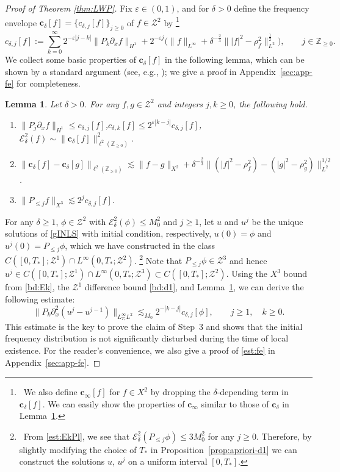 \documentclass{amsart}
\newtheorem{lemma}[proposition]{Lemma}
\numberwithin{equation}{section}
\newcommand{\Z}{\mathbb{Z}}
\newcommand{\eps}{\varepsilon}
\begin{document}
\begin{proof}[Proof of Theorem \ref{thm:LWP}]
Fix $\eps \in (0,1)$, and for $\delta>0$ define the frequency envelope $\mathbf{c}_\delta [f]=\{ c_{\delta,j}[f]\}_{j\geq 0}$ of $f\in \mathcal{Z}^2$ by%
\footnote{~We also define $\mathbf{c}_\infty [f]$ for $f\in X^2$ by dropping the $\delta$-depending term in $\mathbf{c}_\delta [f]$.
We can easily show the properties of $\mathbf{c}_\infty$ similar to those of $\mathbf{c}_\delta$ in Lemma~\ref{lem:fe}.}
\[ c_{\delta,j}[f]:=\sum _{k=0}^{\infty}2^{-\eps |j-k|}\| P_k\partial_xf\|_{H^1}+2^{-\eps j}\big( \| f\|_{L^\infty}+\delta^{-\frac23}\big\| |f|^2-\rho_f^2\big\|_{L^2}^{\frac12}\big) ,\qquad j\in\Z_{\geq 0}.\]
We collect some basic properties of $\mathbf{c}_\delta [f]$ in the following lemma, which can be shown by a standard argument (see, e.g., \cite{Ifrim-Tataru}); we give a proof in Appendix~\ref{sec:app-fe} for completeness.
\begin{lemma}\label{lem:fe}
Let $\delta>0$.
For any $f,g\in \mathcal{Z}^2$ and integers $j,k\geq 0$, the following hold.
\begin{enumerate}
\item[$\mathrm{(i)}$] $\| P_j\partial_xf\|_{H^1}\leq c_{\delta,j}[f]$,\quad $c_{\delta,k}[f]\leq 2^{\eps |k-j|}c_{\delta,j}[f]$,\quad $\mathcal{E}^2_\delta(f)\sim \| \mathbf{c}_\delta[f]\|_{\ell^2(\Z_{\geq 0})}^2$.
\item[$\mathrm{(ii)}$] $\big\| \mathbf{c}_\delta[f]-\mathbf{c}_\delta[g]\big\| _{\ell^2(\Z_{\geq 0})}\lesssim \| f-g\|_{X^2}+\delta^{-\frac23}\big\| (|f|^2-\rho_f^2)-(|g|^2-\rho_g^2)\big\|_{L^2}^{1/2}$.
\item[$\mathrm{(iii)}$] $\| P_{\leq j}f\|_{X^3}\lesssim 2^jc_{\delta,j}[f]$.
\end{enumerate}
\end{lemma}

For any $\delta\geq 1$, $\phi\in \mathcal{Z}^2$ with $\mathcal{E}^2_\delta(\phi)\leq M_0^2$ and $j\geq 1$, let $u$ and $u^j$ be the unique solutions of \eqref{gINLS} with initial condition, respectively, $u(0)=\phi$ and $u^j(0)=P_{\leq j}\phi$, which we have constructed in the class $C([0,T_*];\mathcal{Z}^1)\cap L^\infty(0,T_*;\mathcal{Z}^2)$.%
\footnote{~From \eqref{est:EkPl}, we see that $\mathcal{E}^2_\delta(P_{\leq j}\phi)\leq 3M_0^2$ for any $j\geq 0$.
Therefore, by slightly modifying the choice of $T_*$ in Proposition~\ref{prop:apriori-d1} we can construct the solutions $u$, $u^j$ on a uniform interval $[0,T_*]$.}
Note that $P_{\leq j}\phi\in \mathcal{Z}^3$ and hence $u^j\in C([0,T_*];\mathcal{Z}^1)\cap L^\infty(0,T_*;\mathcal{Z}^3)\subset C([0,T_*];\mathcal{Z}^2)$.
Using the $X^3$ bound from \eqref{bd:Ek}, the $\mathcal{Z}^1$ difference bound \eqref{bd:d1}, and Lemma~\ref{lem:fe}, we can derive the following estimate:
\begin{equation}\label{est:fe}
\big\| P_k\partial_x^2(u^j-u^{j-1})\big\|_{L^\infty_{T_*}L^2}\lesssim_{M_0} 2^{-|k-j|}c_{\delta,j}[\phi],\qquad j\geq 1,\quad k\geq 0.
\end{equation}
This estimate is the key to prove the claim of Step~3 and shows that the initial frequency distribution is not significantly disturbed during the time of local existence. 
For the reader's convenience, we also give a proof of \eqref{est:fe} in Appendix~\ref{sec:app-fe}.


\end{proof}
\end{document}
